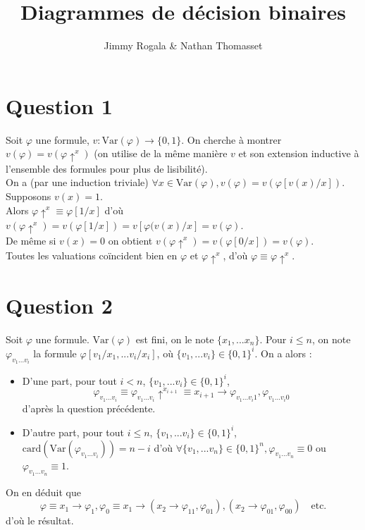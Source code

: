 \documentclass[12pt]{article}
\title{Diagrammes de décision binaires}
\author{Jimmy Rogala \& Nathan Thomasset}
\begin{document}
\maketitle

\section*{Question 1}

Soit $\varphi$ une formule, $v : \text{Var}(\varphi) \to \{0, 1\}$. On cherche à montrer $v(\varphi) = v(\varphi\uparrow^{x})$ (on utilise de la même manière $v$ et son extension inductive à l'ensemble des formules pour plus de lisibilité). \\
On a (par une induction triviale) $\forall x \in \text{Var}(\varphi), v(\varphi)=v(\varphi[v(x)/x])$. \\
Supposons $v(x)=1$. \\
Alors $\varphi\uparrow^{x} \equiv \varphi[1/x]$ d'où $v(\varphi\uparrow^{x})=v(\varphi[1/x])=v[\varphi(v(x)/x]=v(\varphi)$. \\
De même si $v(x)=0$ on obtient $v(\varphi\uparrow^{x})=v(\varphi[0/x])=v(\varphi)$. \\
Toutes les valuations coïncident bien en $\varphi$ et $\varphi\uparrow^{x}$, d'où $\varphi \equiv \varphi\uparrow^{x}$.

\section*{Question 2}

Soit $\varphi$ une formule. $\text{Var}(\varphi)$ est fini, on le note $\{x_1, ... x_n\}$. Pour $i \leq n$, on note $\varphi_{v_1...v_i}$ la formule $\varphi[v_1/x_1,...v_i/x_i]$, où $\{v_1,...v_i\} \in \{0,1\}^i$. On a alors : 
\begin{itemize}
 \item D'une part, pour tout $i < n$, $\{v_1,...v_i\} \in \{0,1\}^i$, $$\varphi_{v_1...v_i} \equiv \varphi_{v_1...v_i}\uparrow^{x_{i+1}} \equiv x_{i+1} \to \varphi_{v_1...v_i1}, \varphi_{v_1...v_i0}$$ d'après la question précédente.
 \item D'autre part, pour tout $i \leq n$, $\{v_1,...v_i\} \in \{0,1\}^i$, $\text{card}(\text{Var}(\varphi_{v_1...v_i})) = n-i$ d'où $\forall \{v_1,...v_n\} \in \{0,1\}^n, \varphi_{v_1...v_n} \equiv 0$ ou $\varphi_{v_1...v_n} \equiv 1$.
\end{itemize}
On en déduit que $$\varphi \equiv x_1 \to \varphi_1,\varphi_0 \equiv x_1 \to (x_2 \to \varphi_{11}, \varphi_{01}), (x_2 \to \varphi_{01}, \varphi_{00}) \quad \text{etc.}$$
d'où le résultat.
\end{document}
